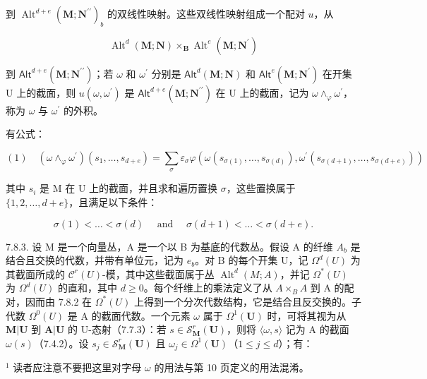 到 \(\operatorname{Alt}^{d + e}(\mathbf{M};\mathbf{N}^{\prime \prime})_{b}\) 的双线性映射。这些双线性映射组成一个配对 \(u\)，从

\[
\operatorname{Alt} ^ {d} (\mathbf {M}; \mathbf {N}) \times_ {\mathbf {B}} \operatorname{Alt} ^ {e} (\mathbf {M}; \mathbf {N} ^ {\prime})
\]

到 \(\mathsf{Alt}^{d + e}(\mathbf{M};\mathbf{N}^{\prime \prime})\)；若 \(\omega\) 和 \(\omega^{\prime}\) 分别是 \(\mathsf{Alt}^{d}(\mathbf{M};\mathbf{N})\) 和 \(\mathsf{Alt}^{e}(\mathbf{M};\mathbf{N}^{\prime})\) 在开集 U 上的截面，则 \(u(\omega ,\omega^{\prime})\) 是 \(\mathsf{Alt}^{d + e}(\mathbf{M};\mathbf{N}^{\prime \prime})\) 在 U 上的截面，记为 \(\omega \wedge_{\varphi}\omega^{\prime}\)，称为 \(\omega\) 与 \(\omega^{\prime}\) 的外积。

有公式：

\[
(1) \quad \left(\omega \wedge_ {\varphi} \omega^ {\prime}\right) \left(s _ {1}, \dots , s _ {d + e}\right) = \sum_ {\sigma} \varepsilon_ {\sigma} \varphi \left(\omega \left(s _ {\sigma (1)}, \dots , s _ {\sigma (d)}\right), \omega^ {\prime} \left(s _ {\sigma (d + 1)}, \dots , s _ {\sigma (d + e)}\right)\right)
\]

其中 \(s_{i}\) 是 M 在 U 上的截面，并且求和遍历置换 \(\sigma\)，这些置换属于 \(\{1,2,\ldots,d+e\}\)，且满足以下条件：

\[
\sigma (1) <   \dots <   \sigma (d) \quad \text { and } \quad \sigma (d + 1) <   \dots <   \sigma (d + e).
\]

7.8.3. 设 M 是一个向量丛，A 是一个以 B 为基底的代数丛。假设 A 的纤维 \(A_{b}\) 是结合且交换的代数，并带有单位元，记为 \(e_{b}\)。对 B 的每个开集 U，记 \(\Omega^{d}(U)\) 为其截面所成的 \(\mathcal{C}^{r}(U)\)-模，其中这些截面属于丛 \(\operatorname{Alt}^{d}(M;A)\)，并记 \(\Omega^{*}(U)\) 为 \(\Omega^{d}(U)\) 的直和，其中 \(d\geqslant0\)。每个纤维上的乘法定义了从 \(A\times_{B}A\) 到 A 的配对，因而由 7.8.2 在 \(\Omega^{*}(U)\) 上得到一个分次代数结构，它是结合且反交换的。子代数 \(\Omega^{0}(U)\) 是 A 的截面代数。一个元素 \(\omega\) 属于 \(\Omega^{1}(\mathbf{U})\) 时，可将其视为从 \(\mathbf{M}|\mathbf{U}\) 到 \(\mathbf{A}|\mathbf{U}\) 的 U-态射（7.7.3）：若 \(s\in\mathcal{S}_{\mathbf{M}}^{r}(\mathbf{U})\)，则将 \(\langle\omega,s\rangle\) 记为 A 的截面 \(\omega(s)\)（7.4.2）。设 \(s_{j}\in\mathcal{S}_{\mathbf{M}}^{r}(\mathbf{U})\) 且 \(\omega_{j}\in\Omega^{1}(\mathbf{U})\)（\(1\leqslant j\leqslant d\)）；有：

\(^{1}\) 读者应注意不要把这里对字母 \(\omega\) 的用法与第 10 页定义的用法混淆。

